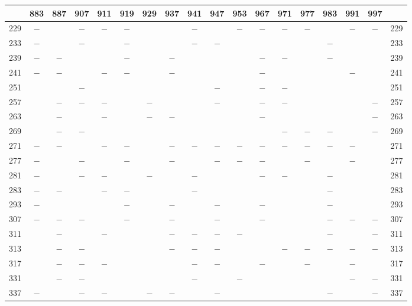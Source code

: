 \begin{center}\begingroup\fontsize{8}{10.5}\selectfont\setlength{\tabcolsep}{2pt}
\begin{tabular}{r|c|c|c|c|c|c|c|c|c|c|c|c|c|c|c|c|r}
\hline
 & 883 & 887 & 907 & 911 & 919 & 929 & 937 & 941 & 947 & 953 & 967 & 971 & 977 & 983 & 991 & 997 & \\
\hline
229 & $-$ &  & $-$ & $-$ & $-$ &  &  & $-$ &  & $-$ & $-$ & $-$ & $-$ &  & $-$ & $-$ & 229\\
233 & $-$ &  & $-$ &  & $-$ &  &  & $-$ & $-$ &  &  &  &  & $-$ &  &  & 233\\
239 & $-$ & $-$ &  &  & $-$ &  & $-$ &  &  &  & $-$ & $-$ &  & $-$ &  &  & 239\\
241 & $-$ & $-$ &  & $-$ & $-$ &  & $-$ &  &  &  & $-$ &  &  &  & $-$ &  & 241\\
251 &  &  & $-$ &  &  &  &  &  & $-$ &  & $-$ & $-$ &  &  &  &  & 251\\
257 &  & $-$ & $-$ & $-$ &  & $-$ &  &  & $-$ &  & $-$ & $-$ &  &  &  & $-$ & 257\\
263 &  & $-$ &  & $-$ &  & $-$ & $-$ &  &  &  & $-$ &  &  &  &  & $-$ & 263\\
269 &  & $-$ & $-$ &  &  &  &  &  &  &  &  & $-$ & $-$ & $-$ &  & $-$ & 269\\
271 & $-$ & $-$ &  & $-$ & $-$ &  & $-$ & $-$ & $-$ & $-$ & $-$ & $-$ & $-$ & $-$ & $-$ &  & 271\\
277 & $-$ &  & $-$ &  & $-$ &  & $-$ &  & $-$ & $-$ & $-$ &  & $-$ &  & $-$ &  & 277\\
281 & $-$ &  & $-$ & $-$ &  & $-$ &  & $-$ &  &  & $-$ & $-$ &  & $-$ &  &  & 281\\
283 & $-$ & $-$ &  & $-$ & $-$ &  &  & $-$ &  &  &  &  &  & $-$ &  &  & 283\\
293 & $-$ &  &  &  & $-$ &  & $-$ &  & $-$ &  & $-$ &  &  & $-$ &  &  & 293\\
307 & $-$ & $-$ & $-$ &  & $-$ &  & $-$ &  & $-$ &  & $-$ &  &  & $-$ & $-$ & $-$ & 307\\
311 &  & $-$ &  & $-$ &  &  & $-$ & $-$ & $-$ & $-$ &  &  &  & $-$ &  & $-$ & 311\\
313 &  & $-$ & $-$ &  &  &  & $-$ & $-$ & $-$ &  &  & $-$ & $-$ & $-$ & $-$ & $-$ & 313\\
317 &  & $-$ & $-$ & $-$ &  &  &  & $-$ & $-$ &  & $-$ &  & $-$ &  & $-$ &  & 317\\
331 &  & $-$ & $-$ &  &  &  &  & $-$ &  & $-$ &  &  &  &  & $-$ & $-$ & 331\\
337 & $-$ &  & $-$ & $-$ &  & $-$ & $-$ &  & $-$ &  &  &  &  & $-$ &  & $-$ & 337\\

\end{tabular}
\end{center}
